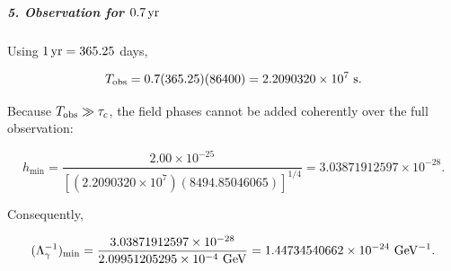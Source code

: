 \subparagraph*{5. Observation for $0.7\,{\rm yr}$}

Using $1\,{\rm yr}=365.25$ days,

\[
T_{\rm obs} = 0.7(365.25)(86400) = 2.2090320\times10^7\ {\rm s}.
\]

Because $T_{\rm obs}\gg\tau_c$, the field phases cannot be added coherently over the full observation:

\[
h_{\min} = \frac{2.00\times10^{-25}} {\left[(2.2090320\times10^7)(8494.85046065)\right]^{1/4}} = 3.03871912597\times10^{-28}.
\]

Consequently,

\[
(\Lambda_\gamma^{-1})_{\min} = \frac{3.03871912597\times10^{-28}} {2.09951205295\times10^{-4}\ {\rm GeV}} = 1.44734540662\times10^{-24}\ {\rm GeV^{-1}}.
\]
